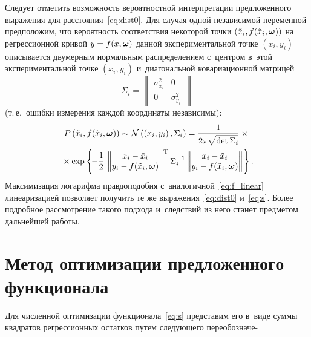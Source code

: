\begin{multicols}{2}
Следует отметить возможность вероятностной интерпретации предложенного
выражения для рассто\-яния~\eqref{eq:dist0}.
Для случая одной независимой переменной предположим, что
вероятность соответствия некоторой точки $(\tilde{x}_i, f(\tilde{x}_i,  \boldsymbol{\omega}))$
на регрессионной кривой $y \hm= f(x, \bomega)$
данной экспериментальной точке $(x_i, y_i)$
описывается двумерным нормальным распределением
с~центром в~этой экспериментальной точке $(x_i, y_i)$
и~диагональной ковариационной мат\-ри\-цей
$$
\Sigma_i = \begin{Vmatrix} \sigma_{x_i}^2 & 0 \\[2pt] 
0 & \sigma_{y_i}^2  \end{Vmatrix}
$$
(т.\,е.\ ошибки измерения каждой координаты независимы):
\begin{multline*}
  P\left(\tilde{x}_i, f(\tilde{x}_i, \boldsymbol{\omega})\right) \sim
   \mathcal{N}\left(\left(x_i, y_i\right), \Sigma_i\right)
    = \displaystyle\frac{\displaystyle 1\mathstrut}{\displaystyle 2 \pi \sqrt{\mathrm{det}\,\Sigma_i}\mathstrut}\times{}\\
    {}\times
            \exp \left\{\! -\displaystyle\frac{\displaystyle 1\mathstrut}{\displaystyle 2\mathstrut}\,
                        \left\|\begin{matrix} x_i - \tilde{x}_i \\ 
y_i - f(\tilde{x}_i, \boldsymbol{\omega}) \end{matrix}\right\|^\mathrm{T}
                        \Sigma_i^{-1}
                        \left\|\begin{matrix} x_i - \tilde{x}_i \\ 
y_i - f(\tilde{x}_i, \boldsymbol{\omega}) \end{matrix}\right\|
                 \right\}.\hspace*{-1.14958pt}
\end{multline*}
Максимизация логарифма правдоподобия
с~аналогичной~\eqref{eq:f_linear} линеаризацией
позволяет получить те же выражения~\eqref{eq:dist0} и~\eqref{eq:s}.
Более подробное рас\-смот\-ре\-ние такого подхода
и~следствий из него станет предметом дальнейшей работы.

\section{Метод оптимизации предложенного функционала}

Для численной оптимизации функционала~\eqref{eq:s} представим его в~виде
суммы квадратов регрессионных остатков путем следующего переобозначе-\linebreak\vspace*{-12pt}


\end{multicols}
